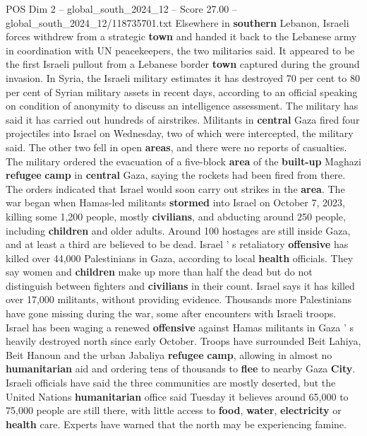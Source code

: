 \begin{textsample}{POS Dim 2 – global\_south\_2024\_12 – Score 27.00 – global\_south\_2024\_12/118735701.txt}
Elsewhere in \textbf{southern} Lebanon, Israeli forces withdrew from a strategic \textbf{town} and handed it back to the Lebanese army in coordination with UN peacekeepers, the two militaries said.
It appeared to be the first Israeli pullout from a Lebanese border \textbf{town} captured during the ground invasion.
In Syria, the Israeli military estimates it has destroyed 70 per cent to 80 per cent of Syrian military assets in recent days, according to an official speaking on condition of anonymity to discuss an intelligence assessment.
The military has said it has carried out hundreds of airstrikes.
Militants in \textbf{central} Gaza fired four projectiles into Israel on Wednesday, two of which were intercepted, the military said.
The other two fell in open \textbf{areas}, and there were no reports of casualties.
The military ordered the evacuation of a five-block \textbf{area} of the \textbf{built-up} Maghazi \textbf{refugee} \textbf{camp} in \textbf{central} Gaza, saying the rockets had been fired from there.
The orders indicated that Israel would soon carry out strikes in the \textbf{area}.
The war began when Hamas-led militants \textbf{stormed} into Israel on October 7, 2023, killing some 1,200 people, mostly \textbf{civilians}, and abducting around 250 people, including \textbf{children} and older adults.
Around 100 hostages are still inside Gaza, and at least a third are believed to be dead.
Israel ' s retaliatory \textbf{offensive} has killed over 44,000 Palestinians in Gaza, according to local \textbf{health} officials.
They say women and \textbf{children} make up more than half the dead but do not distinguish between fighters and \textbf{civilians} in their count.
Israel says it has killed over 17,000 militants, without providing evidence.
Thousands more Palestinians have gone missing during the war, some after encounters with Israeli troops.
Israel has been waging a renewed \textbf{offensive} against Hamas militants in Gaza ' s heavily destroyed north since early October.
Troops have surrounded Beit Lahiya, Beit Hanoun and the urban Jabaliya \textbf{refugee} \textbf{camp}, allowing in almost no \textbf{humanitarian} aid and ordering tens of thousands to \textbf{flee} to nearby Gaza \textbf{City}.
Israeli officials have said the three communities are mostly deserted, but the United Nations \textbf{humanitarian} office said Tuesday it believes around 65,000 to 75,000 people are still there, with little access to \textbf{food}, \textbf{water}, \textbf{electricity} or \textbf{health} care.
Experts have warned that the north may be experiencing famine.

\end{textsample}

